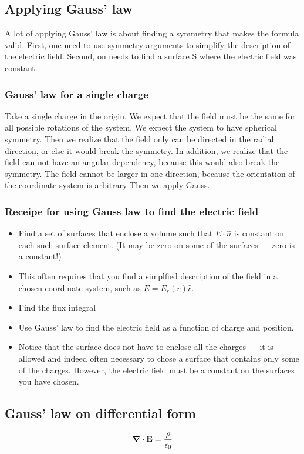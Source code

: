 \documentclass[
12pt, reprint, aip, onecolumn, notitlepage
]{revtex4-1}
\begin{document}
\subsection{Applying Gauss' law}
A lot of applying Gauss' law is about finding a symmetry that makes the formula valid. First, one need to use symmetry arguments to simplify the description of the electric field. Second, on needs to find a surface S where the electric field was constant. 
\subsubsection{Gauss' law for a single charge}
Take a single charge in the origin. We expect that the field must be the same for all possible rotations of the system. We expect the system to have spherical symmetry. Then we realize that the field only can be directed in the radial direction, or else it would break the symmetry. In addition, we realize that the field can not have an angular dependency, because this would also break the symmetry. The field cannot be larger in one direction, because the orientation of the coordinate system is arbitrary Then we apply Gauss.
\subsubsection{Receipe for using Gauss law to find the electric field}
\begin{itemize}
	\item Find a set of surfaces that enclose a volume such that $E\cdot\hat{n}$ is constant
	on each such surface element. (It may be zero on some of the surfaces
	— zero is a constant!)
	\item This often requires that you find a simplfied description of the field
	in a chosen coordinate system, such as $E = E_r(r)\hat{r}$.
	\item Find the flux integral
	\item Use Gauss’ law to find the electric field as a function of charge and
	position.
	\item Notice that the surface does not have to enclose all the charges — it
	is allowed and indeed often necessary to chose a surface that contains
	only some of the charges. However, the electric field must be a constant
	on the surfaces you have chosen.
\end{itemize}
\subsection{Gauss' law on differential form}
\begin{equation}
	\grad \cdot \mathbf{E} = \dfrac{\rho}{\epsilon_0} 
\end{equation}
\end{document}
